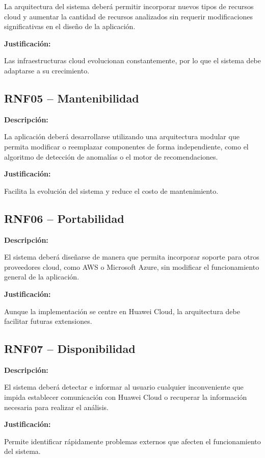La arquitectura del sistema deberá permitir incorporar nuevos tipos de recursos cloud y aumentar la cantidad de recursos analizados sin requerir modificaciones significativas en el diseño de la aplicación.

\noindent \textbf{Justificación:}

Las infraestructuras cloud evolucionan constantemente, por lo que el sistema debe adaptarse a su crecimiento.

\subsection{RNF05 -- Mantenibilidad}

\noindent \textbf{Descripción:}

La aplicación deberá desarrollarse utilizando una arquitectura modular que permita modificar o reemplazar componentes de forma independiente, como el algoritmo de detección de anomalías o el motor de recomendaciones.

\noindent \textbf{Justificación:}

Facilita la evolución del sistema y reduce el costo de mantenimiento.

\subsection{RNF06 -- Portabilidad}

\noindent \textbf{Descripción:}

El sistema deberá diseñarse de manera que permita incorporar soporte para otros proveedores cloud, como AWS o Microsoft Azure, sin modificar el funcionamiento general de la aplicación.

\noindent \textbf{Justificación:}

Aunque la implementación se centre en Huawei Cloud, la arquitectura debe facilitar futuras extensiones.

\subsection{RNF07 -- Disponibilidad}

\noindent \textbf{Descripción:}

El sistema deberá detectar e informar al usuario cualquier inconveniente que impida establecer comunicación con Huawei Cloud o recuperar la información necesaria para realizar el análisis.

\noindent \textbf{Justificación:}

Permite identificar rápidamente problemas externos que afecten el funcionamiento del sistema.


